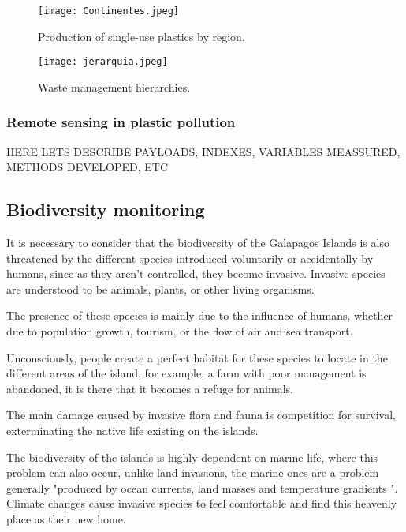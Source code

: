\documentclass[10pt,english, openany]{book}
\begin{document}
\begin{figure}[h!]
    \centering\texttt{[image: Continentes.jpeg]}
    \caption{Production of single-use plastics by region.\cite{ONU}}
    \label{fig9:spect}
\end{figure}

\begin{figure}[h!]
    \centering\texttt{[image: jerarquia.jpeg]}
    \caption{Waste management hierarchies.\cite{ONU}}
    \label{fig10:spect}
\end{figure}

\pagebreak


\subsubsection{Remote sensing in plastic pollution}

HERE LETS DESCRIBE PAYLOADS; INDEXES, VARIABLES MEASSURED, METHODS DEVELOPED, ETC 

\subsection{Biodiversity monitoring}

It is necessary to consider that the biodiversity of the Galapagos Islands is also threatened by the different species introduced voluntarily or accidentally by humans, since as they aren’t controlled, they become invasive. Invasive species are understood to be animals, plants, or other living organisms.

The presence of these species is mainly due to the influence of humans, whether due to population growth, tourism, or the flow of air and sea transport.\cite{HernandezMaresPablo2016}

Unconsciously, people create a perfect habitat for these species to locate in the different areas of the island, for example, a farm with poor management is abandoned, it is there that it becomes a refuge for animals.

The main damage caused by invasive flora and fauna is competition for survival, exterminating the native life existing on the islands. \cite{Balmori2014}

The biodiversity of the islands is highly dependent on marine life, where this problem can also occur, unlike land invasions, the marine ones are a problem generally "produced by ocean currents, land masses and temperature gradients "\cite{Jaramillo2015}. Climate changes cause invasive species to feel comfortable and find this heavenly place as their new home.
\end{document}
